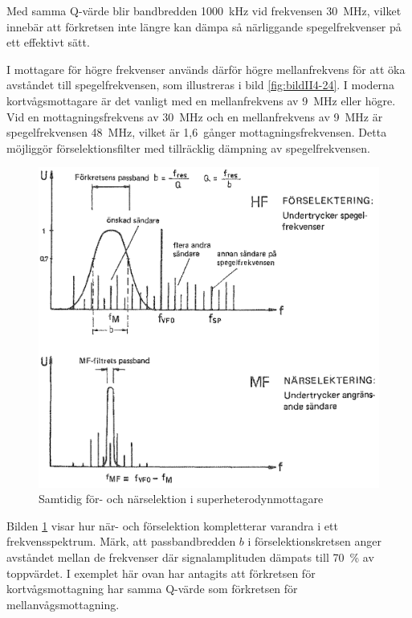 Med samma Q-värde blir bandbredden 1000~kHz vid frekvensen 30~MHz, vilket
innebär att förkretsen inte längre kan dämpa så närliggande spegelfrekvenser
på ett effektivt sätt.

I mottagare för högre frekvenser används därför högre mellanfrekvens
för att öka avståndet till spegelfrekvensen, som illustreras i bild
\ref{fig:bildII4-24}.
I moderna kortvågsmottagare är det vanligt med en mellanfrekvens av 9~MHz
eller högre.
Vid en mottagningsfrekvens av 30~MHz och en mellanfrekvens av 9~MHz är
spegelfrekvensen 48~MHz, vilket är 1,6~gånger mottagningsfrekvensen.
Detta möjliggör förselektionsfilter med tillräcklig dämpning av
spegelfrekvensen.

\begin{figure}
  \includegraphics[width=\textwidth]{images/cropped_pdfs/bild_2_4-25.pdf}
  \caption{Samtidig för- och närselektion i superheterodynmottagare}
  \label{fig:bildII4-25}
\end{figure}

Bilden \ref{fig:bildII4-25} visar hur när- och förselektion kompletterar
varandra i ett frekvensspektrum.
Märk, att passbandbredden \(b\) i förselektionskretsen anger avståndet mellan
de frekvenser där signalamplituden dämpats till 70~\% av toppvärdet.
I exemplet här ovan har antagits att förkretsen för kortvågsmottagning har
samma Q-värde som förkretsen för mellanvågsmottagning.

